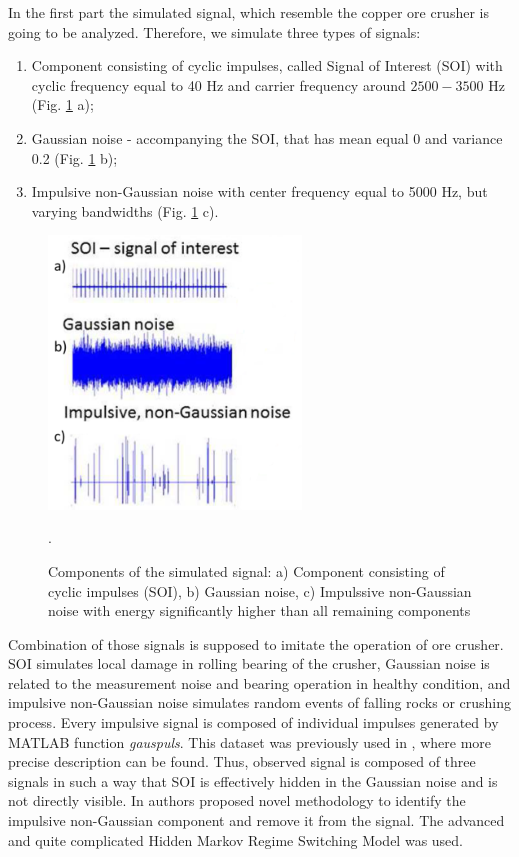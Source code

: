 \documentclass[preprint,12pt]{elsarticle}
\begin{document}
In the first part the simulated signal, which resemble the copper ore crusher is going to be analyzed. Therefore, we simulate three types of signals:

\begin{enumerate}
    \item Component consisting of cyclic impulses, called Signal of Interest (SOI) with cyclic frequency equal to 40 Hz and carrier frequency around $2500-3500$ Hz (Fig. \ref{fig:schemat sygnal} a);
    \item Gaussian noise - accompanying the SOI, that has mean equal 0 and variance 0.2 (Fig. \ref{fig:schemat sygnal} b);
    \item Impulsive non-Gaussian noise with center frequency equal to 5000 Hz, but varying bandwidths (Fig. \ref{fig:schemat sygnal} c).
\end{enumerate}

\begin{figure}[ht!]
    \centering
    \includegraphics[width = 0.6\textwidth]{figs3/sym_signal_components.png}
     \caption{ Components of the simulated signal: a) Component consisting of cyclic impulses (SOI), b) Gaussian noise, c) Impulssive non-Gaussian noise with energy significantly higher than all remaining components}.
    \label{fig:schemat sygnal}
\end{figure}


Combination of those signals is supposed to imitate the operation of ore crusher. SOI simulates local damage in rolling bearing of the crusher, Gaussian noise is related to the measurement noise and bearing operation in healthy condition, and impulsive non-Gaussian noise simulates random events of falling rocks or crushing process. Every impulsive signal is composed of individual impulses generated by MATLAB function \emph{gauspuls}. This dataset was previously used in \cite{wylomanskaimpulsive}, where more precise description can be found. Thus, observed signal is composed of three signals in such a way that SOI is effectively hidden in the Gaussian noise and is not directly visible. In \cite{wylomanskaimpulsive} authors proposed novel methodology to identify the impulsive non-Gaussian component and remove it from the signal. The  advanced and quite complicated Hidden Markov Regime Switching Model was used. 
\end{document}
